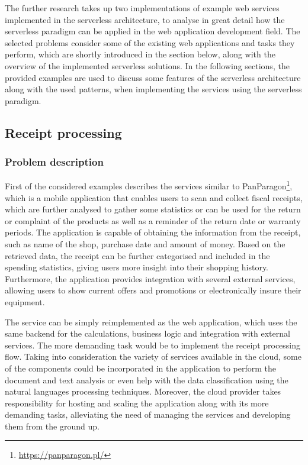 The further research takes up two implementations of example web services implemented in the serverless architecture, to analyse in great detail how the serverless paradigm can be applied in the web application development field.
The selected problems consider some of the existing web applications and tasks they perform, which are shortly introduced in the section below, along with the overview of the implemented serverless solutions.
In the following sections, the provided examples are used to discuss some features of the serverless architecture along with the used patterns, when implementing the services using the serverless paradigm.

\subsection{Receipt processing}

\subsubsection{Problem description}

First of the considered examples describes the services similar to PanParagon\footnote{\url{https://panparagon.pl/}}, which is a mobile application that enables users to scan and collect fiscal receipts, which are further analysed to gather some statistics or can be used for the return or complaint of the products as well as a reminder of the return date or warranty periods.
The application is capable of obtaining the information from the receipt, such as name of the shop, purchase date and amount of money. Based on the retrieved data, the receipt can be further categorised and included in the spending statistics, giving users more insight into their shopping history. Furthermore, the application provides integration with several external services, allowing users to show current offers and promotions or electronically insure their equipment.

The service can be simply reimplemented as the web application, which uses the same backend for the calculations, business logic and integration with external services. The more demanding task would be to implement the receipt processing flow. Taking into consideration the variety of services available in the cloud, some of the components could be incorporated in the application to perform the document and text analysis or even help with the data classification using the natural languages processing techniques. Moreover, the cloud provider takes responsibility for hosting and scaling the application along with its more demanding tasks, alleviating the need of managing the services and developing them from the ground up.


